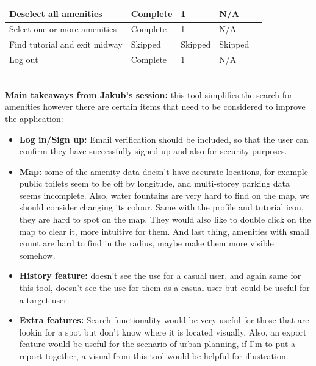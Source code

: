 \begin{table}[h!]
\begin{tabular}{|p{}|p{}|p{}|p{}|p{}|}
        \hline
        Deselect all amenities        & Complete        & 1                   & N/A                \\
        \hline
        Select one or more amenities  & Complete        & 1                   & N/A                \\
        \hline
        Find tutorial and exit midway & Skipped         & Skipped             & Skipped            \\
        \hline
        Log out                       & Complete        & 1                   & N/A                \\
        \hline
    \end{tabular}
\end{table}\\
\noindent\textbf{Main takeaways from Jakub's session: }this tool simplifies the search for amenities however there are certain items that need to be considered to improve the application:
\begin{itemize}
    \item \textbf{Log in/Sign up: }Email verification should be included, so that the user can confirm they have successfully signed up and also for security purposes.\\
    \item \textbf{Map: }some of the amenity data doesn't have accurate locations, for example public toilets seem to be off by longitude, and multi-storey parking data seems incomplete. Also, water fountains are very hard to find on the map, we should consider changing its colour. Same with the profile and tutorial icon, they are hard to spot on the map. They would also like to double click on the map to clear it, more intuitive for them. And last thing, amenities with small count are hard to find in the radius, maybe make them more visible somehow.\\
    \item \textbf{History feature: }doesn't see the use for a casual user, and again same for this tool, doesn't see the use for them as a casual user but could be useful for a target user.\\
    \item \textbf{Extra features: }Search functionality would be very useful for those that are lookin for a spot but don't know where it is located visually. Also, an export feature would be useful for the scenario of urban planning, if I'm to put a report together, a visual from this tool would be helpful for illustration.
\end{itemize}
